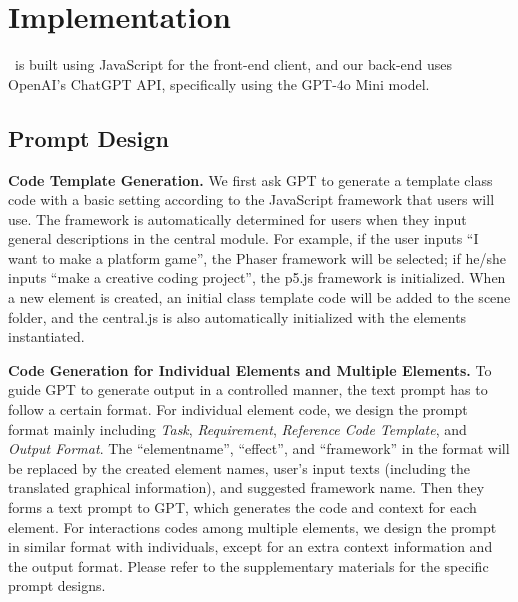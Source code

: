 \section{Implementation}
\sysName~is built using JavaScript for the front-end client, and our back-end uses OpenAI’s ChatGPT \cite{openai_chatgpt} API, specifically using the GPT-4o Mini model.

\subsection{Prompt Design}

\textbf{Code Template Generation.} We first ask GPT to generate a template class code with a basic setting according to the JavaScript framework that users {will use}. %
The framework is automatically {determined} 
for users when {they input} %
general descriptions in {the} central module. For example, if the user inputs ``I want to make {a} %
platform game'', {the} Phaser framework will be {selected;}
if he/she inputs ``make %
a creative coding project'', the p5.js framework is initialized. When a new element is created, an initial class template code will be added to the scene folder, and the central.js is also automatically initialized with the elements instantiated.

\textbf{Code Generation for Individual Elements and Multiple Elements.} {To guide GPT to generate output in a controlled manner, the text prompt has to follow a certain format. For individual element code,} we design the prompt {format} %
mainly including \emph{Task}, \emph{Requirement}, \emph{Reference Code Template}, and \emph{Output Format}. The ``elementname'', ``effect'', and ``framework'' in the format will be replaced by the created element names, user's input texts (including the translated graphical information), and suggested framework name. Then they forms a text prompt to GPT{, which generates the} %
code and context for {each} element. For interactions codes among multiple elements, we design the prompt in similar format with individuals, except for an extra context information and the output format. Please refer to the supplementary materials for the specific prompt designs. 


